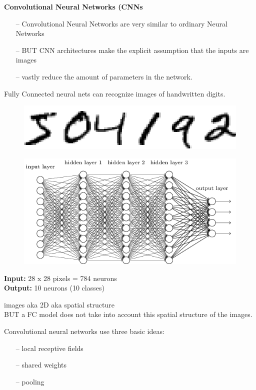 \documentclass[10pt, compress]{beamer}
\begin{document}
\begin{frame}
  \textbf{Convolutional Neural Networks (CNNs} \\ \hfill \break
  \begin{itemize}
    \item[--] Convolutional Neural Networks are very similar to ordinary Neural Networks
    \item[--] BUT CNN architectures make the explicit assumption that the inputs are images
    \item[--] vastly reduce the amount of parameters in the network.
  \end{itemize}
\end{frame}

\begin{frame}
  \vspace{0.6cm}
  \begin{multicols}{2}
    Fully Connected neural nets can recognize images of handwritten digits.
    \columnbreak
    \begin{figure}
      \includegraphics[width=.65\linewidth]{imgs/digits}
    \end{figure}
  \end{multicols}
  \begin{figure}
    \includegraphics[width=.75\linewidth]{imgs/mlp_4}
  \end{figure}
  \textbf{Input:} 28 x 28 pixels = 784 neurons \\
  \textbf{Output:} 10 neurons (10 classes)
\end{frame}

\begin{frame}
  images aka 2D aka spatial structure \\
  BUT a FC model does not take into account this spatial structure of the images.

  Convolutional neural networks use three basic ideas:\\
  \begin{itemize}
    \item[--] local receptive fields
    \item[--] shared weights
    \item[--] pooling
  \end{itemize}
\end{frame}
\end{document}
